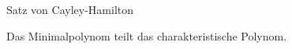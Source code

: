 \documentclass[class=article, crop=false]{standalone}
\begin{document}
\begin{zettel}{Satz von Cayley-Hamilton}

Das Minimalpolynom teilt das charakteristische Polynom.

\end{zettel}
\end{document}
